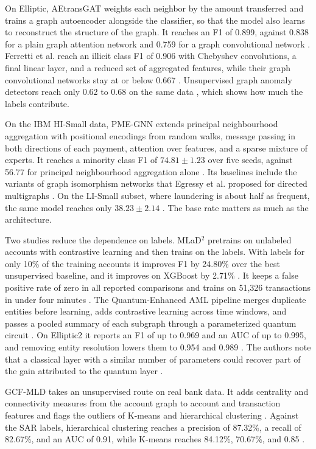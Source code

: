 \documentclass[journal]{IEEEtran}
\begin{document}
On Elliptic, AEtransGAT weights each neighbor by the amount transferred and trains a graph autoencoder alongside the classifier, so that the model also learns to reconstruct the structure of the graph. It reaches an F1 of 0.899, against 0.838 for a plain graph attention network and 0.759 for a graph convolutional network \cite{yu2023aetransgat}. Ferretti et al. reach an illicit class F1 of 0.906 with Chebyshev convolutions, a final linear layer, and a reduced set of aggregated features, while their graph convolutional networks stay at or below 0.667 \cite{ferretti2025gnn}. Unsupervised graph anomaly detectors reach only 0.62 to 0.68 on the same data \cite{yu2023aetransgat}, which shows how much the labels contribute.

On the IBM HI-Small data, PME-GNN extends principal neighbourhood aggregation with positional encodings from random walks, message passing in both directions of each payment, attention over features, and a sparse mixture of experts. It reaches a minority class F1 of $74.81\pm1.23$ over five seeds, against 56.77 for principal neighbourhood aggregation alone \cite{mao2026pmegnn}. Its baselines include the variants of graph isomorphism networks that Egressy et al. proposed for directed multigraphs \cite{egressy2024multignn}. On the LI-Small subset, where laundering is about half as frequent, the same model reaches only $38.23\pm2.14$ \cite{mao2026pmegnn}. The base rate matters as much as the architecture.

Two studies reduce the dependence on labels. MLaD$^2$ pretrains on unlabeled accounts with contrastive learning and then trains on the labels. With labels for only 10\% of the training accounts it improves F1 by 24.80\% over the best unsupervised baseline, and it improves on XGBoost by 2.71\% \cite{luo2024mlad}. It keeps a false positive rate of zero in all reported comparisons and trains on 51{,}326 transactions in under four minutes \cite{luo2024mlad}. The Quantum-Enhanced AML pipeline merges duplicate entities before learning, adds contrastive learning across time windows, and passes a pooled summary of each subgraph through a parameterized quantum circuit \cite{nayak2026quantum}. On Elliptic2 it reports an F1 of up to 0.969 and an AUC of up to 0.995, and removing entity resolution lowers them to 0.954 and 0.989 \cite{nayak2026quantum}. The authors note that a classical layer with a similar number of parameters could recover part of the gain attributed to the quantum layer \cite{nayak2026quantum}.

GCF-MLD takes an unsupervised route on real bank data. It adds centrality and connectivity measures from the account graph to account and transaction features and flags the outliers of K-means and hierarchical clustering \cite{irshad2024gcfmld}. Against the SAR labels, hierarchical clustering reaches a precision of 87.32\%, a recall of 82.67\%, and an AUC of 0.91, while K-means reaches 84.12\%, 70.67\%, and 0.85 \cite{irshad2024gcfmld}.
\end{document}
